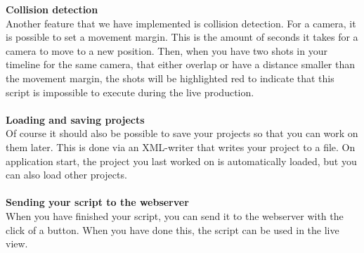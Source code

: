 \textbf{Collision detection}\\
Another feature that we have implemented is collision detection. For a camera, it is possible to set a movement margin. This is the amount of seconds it takes for a camera to move to a new position. Then, when you have two shots in your timeline for the same camera, that either overlap or have a distance smaller than the movement margin, the shots will be highlighted red to indicate that this script is impossible to execute during the live production.\\\\
\textbf{Loading and saving projects}\\
Of course it should also be possible to save your projects so that you can work on them later. This is done via an XML-writer that writes your project to a file. On application start, the project you last worked on is automatically loaded, but you can also load other projects.\\\\
\textbf{Sending your script to the webserver}\\
When you have finished your script, you can send it to the webserver with the click of a button. When you have done this, the script can be used in the live view.


